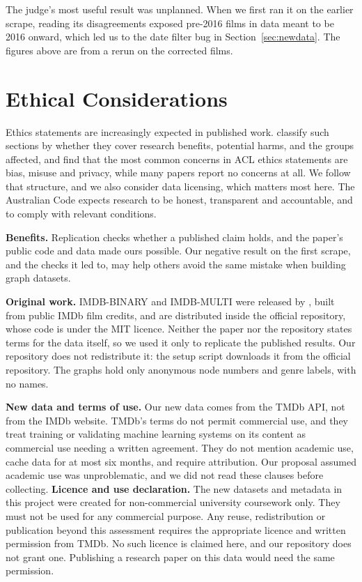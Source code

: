 \documentclass[11pt]{article}
\begin{document}
The judge's most useful result was unplanned. When we first ran it on the earlier scrape, reading its disagreements exposed pre-2016 films in data meant to be 2016 onward, which led us to the date filter bug in Section~\ref{sec:newdata}. The figures above are from a rerun on the corrected films.

\section{Ethical Considerations}
\label{sec:ethics}

Ethics statements are increasingly expected in published work. \citet{benotti2022ethics} classify such sections by whether they cover research benefits, potential harms, and the groups affected, and \citet{karamolegkou2025ethicon} find that the most common concerns in ACL ethics statements are bias, misuse and privacy, while many papers report no concerns at all. We follow that structure, and we also consider data licensing, which matters most here. The Australian Code \citep{nhmrc2018code} expects research to be honest, transparent and accountable, and to comply with relevant conditions.

\textbf{Benefits.} Replication checks whether a published claim holds, and the paper's public code and data made ours possible. Our negative result on the first scrape, and the checks it led to, may help others avoid the same mistake when building graph datasets.

\textbf{Original work.} IMDB-BINARY and IMDB-MULTI were released by \citet{yanardag2015deep}, built from public IMDb film credits, and are distributed inside the official repository, whose code is under the MIT licence. Neither the paper nor the repository states terms for the data itself, so we used it only to replicate the published results. Our repository does not redistribute it: the setup script downloads it from the official repository. The graphs hold only anonymous node numbers and genre labels, with no names.

\textbf{New data and terms of use.} Our new data comes from the TMDb API, not from the IMDb website. TMDb's terms \citep{tmdbterms} do not permit commercial use, and they treat training or validating machine learning systems on its content as commercial use needing a written agreement. They do not mention academic use, cache data for at most six months, and require attribution. Our proposal assumed academic use was unproblematic, and we did not read these clauses before collecting. \textbf{Licence and use declaration.} The new datasets and metadata in this project were created for non-commercial university coursework only. They must not be used for any commercial purpose. Any reuse, redistribution or publication beyond this assessment requires the appropriate licence and written permission from TMDb. No such licence is claimed here, and our repository does not grant one. Publishing a research paper on this data would need the same permission.
\end{document}
